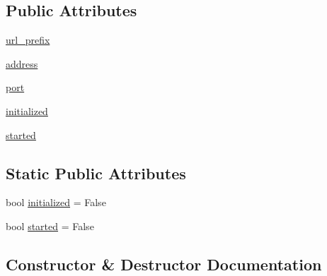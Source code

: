 \subsection*{Public Attributes}
\begin{DoxyCompactItemize}
\item 
\hyperlink{classmatplotlib_1_1backends_1_1backend__webagg_1_1WebAggApplication_ad032f94c2450dea7588cb7508e8a76a8}{url\+\_\+prefix}
\item 
\hyperlink{classmatplotlib_1_1backends_1_1backend__webagg_1_1WebAggApplication_a10d1d8cdc7e6ba29d785963ce3494df6}{address}
\item 
\hyperlink{classmatplotlib_1_1backends_1_1backend__webagg_1_1WebAggApplication_a810f02be2d21230af17021e4d776784b}{port}
\item 
\hyperlink{classmatplotlib_1_1backends_1_1backend__webagg_1_1WebAggApplication_a8f9f52011567a751a4ceebba717262a0}{initialized}
\item 
\hyperlink{classmatplotlib_1_1backends_1_1backend__webagg_1_1WebAggApplication_ab0edf596c25308bf3783bf68d60d63f4}{started}
\end{DoxyCompactItemize}
\subsection*{Static Public Attributes}
\begin{DoxyCompactItemize}
\item 
bool \hyperlink{classmatplotlib_1_1backends_1_1backend__webagg_1_1WebAggApplication_a4d4b3f9c9c09e8c6d58a4e380986e1cf}{initialized} = False
\item 
bool \hyperlink{classmatplotlib_1_1backends_1_1backend__webagg_1_1WebAggApplication_a90a4ed88d9722b8aba4c76b644fb2530}{started} = False
\end{DoxyCompactItemize}


\subsection{Constructor \& Destructor Documentation}
\mbox{\label{classmatplotlib_1_1backends_1_1backend__webagg_1_1WebAggApplication_a8f9737f04ae67abf9b96d55f5b932c49}} 
